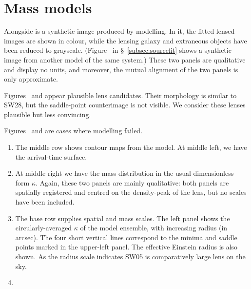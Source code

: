 \section{Mass models}

\begin{figure*}
\caption{\label{fig:kappa}}
\end{figure*}

\begin{figure*}
\caption{\label{fig:arriv}}
\end{figure*}

\begin{figure*}
\label{fig:synth}
\caption{}
\end{figure*}

Alongside is a synthetic image produced by modelling.  In it, the
fitted lensed images are shown in colour, while the lensing galaxy and
extraneous objects have been reduced to grayscale.
(Figure~ in \S~\ref{subsec:sourcefit} shows a
synthetic image from another model of the same system.) These two
panels are qualitative and display no units, and moreover, the mutual
alignment of the two panels is only approximate.

\begin{figure*}
\caption{}
\end{figure*}

Figures~ and  appear plausible lens
candidates.  Their morphology is similar to SW28, but the saddle-point
counterimage is not visible.  We consider these lenses plausible but
less convincing.

Figures~ and  are cases where modelling
failed.

\begin{enumerate}
\item The middle row shows contour maps from the model.  At middle
  left, we have the arrival-time surface.
\item At middle right we have the mass distribution in the usual
  dimensionless form $\kappa$.  Again, these two panels are mainly
  qualitative: both panels are spatially registered and centred on the
  density-peak of the lens, but no scales have been included.
\item The base row supplies spatial and mass scales.  The left panel
  shows the circularly-averaged $\kappa$ of the model ensemble, with
  increasing radius (in arcsec).  The four short vertical lines
  correspond to the minima and saddle points marked in the upper-left
  panel.  The effective Einstein radius \ER is also shown.  As the radius
  scale indicates SW05 is comparatively large lens on the
  sky.
\item 
\end{enumerate}

